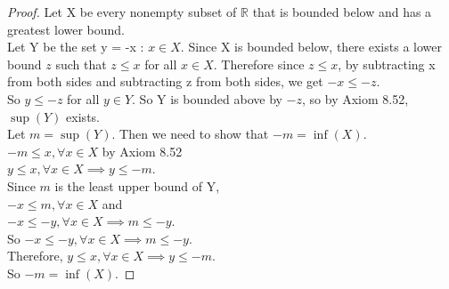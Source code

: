 \documentclass[12pt]{amsart}
\newcommand{\R}{\mathbb{R}}
\begin{document}
\begin{proof} %
	Let X be every nonempty subset of $\R$ that is bounded below and has a greatest lower bound. \\
	Let Y be the set {y = -x : $x \in X$}. Since X is bounded below, there exists a lower bound $z$ such that $z \le x$ for all $x \in X$. Therefore since $z \le x$, by subtracting x from both sides and subtracting z from both sides, we get $-x \le -z$. \\
	So $y \le -z$ for all $y \in Y$. So Y is bounded above by $-z$, so by Axiom 8.52, $\sup(Y)$ exists. \\
	Let $m = \sup(Y)$. Then we need to show that $-m = \inf(X)$. \\
	
	$-m \le x, \forall x \in X$ by Axiom 8.52 \\
	$y \le x, \forall x \in X \implies y \le -m$. \\
	
	Since $m$ is the least upper bound of Y, \\
	$-x \le m, \forall x \in X$ and \\
	$-x \le -y, \forall x \in X \implies m \le -y$. \\
	So $-x \le -y, \forall x \in X \implies m \le -y$. \\
	Therefore, $y \le x, \forall x \in X \implies y \le -m$. \\
	So $-m = \inf(X)$.
\end{proof}
\end{document}
